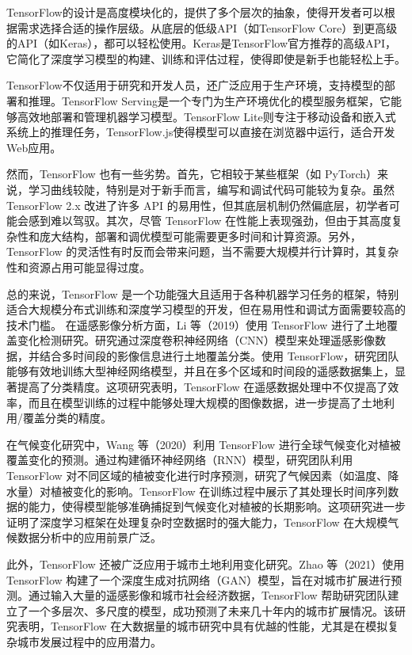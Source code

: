 \documentclass[AutoFakeBold]{LZUThesis-PgD&PhD}
\begin{document}
	TensorFlow的设计是高度模块化的，提供了多个层次的抽象，使得开发者可以根据需求选择合适的操作层级。从底层的低级API（如TensorFlow Core）到更高级的API（如Keras），都可以轻松使用。Keras是TensorFlow官方推荐的高级API，它简化了深度学习模型的构建、训练和评估过程，使得即使是新手也能轻松上手。
	
	TensorFlow不仅适用于研究和开发人员，还广泛应用于生产环境，支持模型的部署和推理。TensorFlow Serving是一个专门为生产环境优化的模型服务框架，它能够高效地部署和管理机器学习模型。TensorFlow Lite则专注于移动设备和嵌入式系统上的推理任务，TensorFlow.js使得模型可以直接在浏览器中运行，适合开发Web应用。
	
	
	然而，TensorFlow 也有一些劣势。首先，它相较于某些框架（如 PyTorch）来说，学习曲线较陡，特别是对于新手而言，编写和调试代码可能较为复杂。虽然 TensorFlow 2.x 改进了许多 API 的易用性，但其底层机制仍然偏底层，初学者可能会感到难以驾驭。其次，尽管 TensorFlow 在性能上表现强劲，但由于其高度复杂性和庞大结构，部署和调优模型可能需要更多时间和计算资源。另外，TensorFlow 的灵活性有时反而会带来问题，当不需要大规模并行计算时，其复杂性和资源占用可能显得过度。
	
	总的来说，TensorFlow 是一个功能强大且适用于各种机器学习任务的框架，特别适合大规模分布式训练和深度学习模型的开发，但在易用性和调试方面需要较高的技术门槛。
	在遥感影像分析方面，Li 等（2019）使用 TensorFlow 进行了土地覆盖变化检测研究\cite{li2019}。研究通过深度卷积神经网络（CNN）模型来处理遥感影像数据，并结合多时间段的影像信息进行土地覆盖分类。使用 TensorFlow，研究团队能够有效地训练大型神经网络模型，并且在多个区域和时间段的遥感数据集上，显著提高了分类精度。这项研究表明，TensorFlow 在遥感数据处理中不仅提高了效率，而且在模型训练的过程中能够处理大规模的图像数据，进一步提高了土地利用/覆盖分类的精度。
	
	在气候变化研究中，Wang 等（2020）利用 TensorFlow 进行全球气候变化对植被覆盖变化的预测\cite{wang2020H}。通过构建循环神经网络（RNN）模型，研究团队利用 TensorFlow 对不同区域的植被变化进行时序预测，研究了气候因素（如温度、降水量）对植被变化的影响。TensorFlow 在训练过程中展示了其处理长时间序列数据的能力，使得模型能够准确捕捉到气候变化对植被的长期影响。这项研究进一步证明了深度学习框架在处理复杂时空数据时的强大能力，TensorFlow 在大规模气候数据分析中的应用前景广泛。
	
	此外，TensorFlow 还被广泛应用于城市土地利用变化研究。Zhao 等（2021）使用 TensorFlow 构建了一个深度生成对抗网络（GAN）模型，旨在对城市扩展进行预测\cite{zhao2021}。通过输入大量的遥感影像和城市社会经济数据，TensorFlow 帮助研究团队建立了一个多层次、多尺度的模型，成功预测了未来几十年内的城市扩展情况。该研究表明，TensorFlow 在大数据量的城市研究中具有优越的性能，尤其是在模拟复杂城市发展过程中的应用潜力。
	
\end{document}
